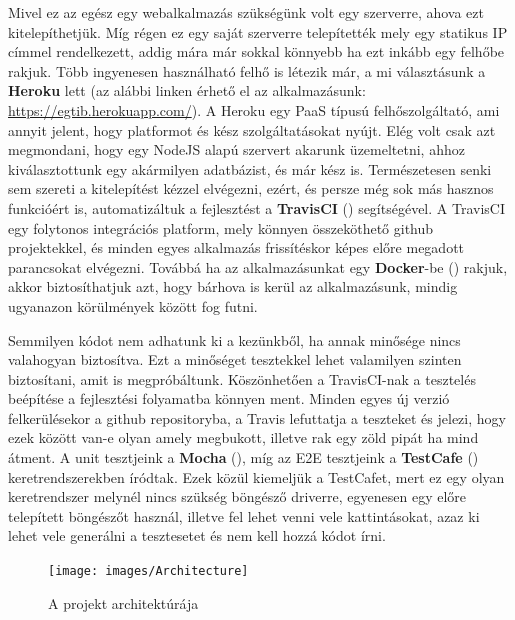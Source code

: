 Mivel ez az egész egy webalkalmazás szükségünk volt egy szerverre, ahova ezt kitelepíthetjük. Míg régen ez egy saját szerverre telepítették mely egy statikus IP címmel rendelkezett, addig mára már sokkal könnyebb ha ezt inkább egy felhőbe rakjuk. Több ingyenesen használható felhő is létezik már, a mi választásunk a \textbf{Heroku} lett (az alábbi linken érhető el az alkalmazásunk: \url{https://egtib.herokuapp.com/}). A Heroku egy PaaS típusú felhőszolgáltató, ami annyit jelent, hogy platformot és kész szolgáltatásokat nyújt. Elég volt csak azt megmondani, hogy egy NodeJS alapú szervert akarunk üzemeltetni, ahhoz kiválasztottunk egy akármilyen adatbázist, és már kész is. Természetesen senki sem szereti a kitelepítést kézzel elvégezni, ezért, és persze még sok más hasznos funkcióért is, automatizáltuk a fejlesztést a \textbf{TravisCI} (\cite{soft:travis}) segítségével. A TravisCI egy folytonos integrációs platform, mely könnyen összeköthető github projektekkel, és minden egyes alkalmazás frissítéskor képes előre megadott parancsokat elvégezni. Továbbá ha az alkalmazásunkat egy \textbf{Docker}-be (\cite{soft:docker}) rakjuk, akkor biztosíthatjuk azt, hogy bárhova is kerül az alkalmazásunk, mindig ugyanazon körülmények között fog futni.

Semmilyen kódot nem adhatunk ki a kezünkből, ha annak minősége nincs valahogyan biztosítva. Ezt a minőséget tesztekkel lehet valamilyen szinten biztosítani, amit is megpróbáltunk. Köszönhetően a TravisCI-nak a tesztelés beépítése a fejlesztési folyamatba könnyen ment. Minden egyes új verzió felkerülésekor a github repositoryba, a Travis lefuttatja a teszteket és jelezi, hogy ezek között van-e olyan amely megbukott, illetve rak egy zöld pipát ha mind átment. A unit tesztjeink a \textbf{Mocha} (\cite{soft:mocha}), míg az E2E tesztjeink a \textbf{TestCafe} (\cite{soft:testcafe}) keretrendszerekben íródtak. Ezek közül kiemeljük a TestCafet, mert ez egy olyan keretrendszer melynél nincs szükség böngésző driverre, egyenesen egy előre telepített böngészőt használ, illetve fel lehet venni vele kattintásokat, azaz ki lehet vele generálni a tesztesetet és nem kell hozzá kódot írni.

\begin{figure}[ht!]
	\centering
	\texttt{[image: images/Architecture]}
	\caption{A projekt architektúrája}
	\label{fig:Architecture}
\end{figure}
